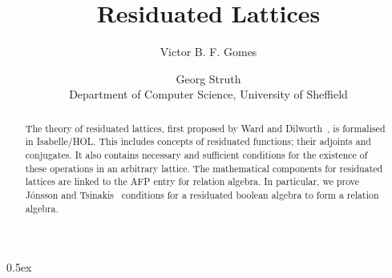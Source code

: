 \documentclass[11pt,a4paper]{article}
\begin{document}
\title{Residuated Lattices}
\author{Victor B. F. Gomes \and Georg Struth \\
  Department of Computer Science, University of Sheffield}
\maketitle

\begin{abstract}
  The theory of residuated lattices, first proposed by Ward and Dilworth~\cite{Ward39},
  is formalised in Isabelle/HOL.
  This includes concepts of residuated functions; their adjoints and conjugates.
  It also contains necessary and sufficient conditions for the existence of these operations
  in an arbitrary lattice.
  The mathematical components for residuated lattices are linked to the AFP entry for relation algebra.
  In particular, we prove J{\'o}nsson and Tsinakis~\cite{Jonsson93} conditions for a residuated
  boolean algebra to form a relation algebra.
\end{abstract}

\tableofcontents

\parindent 0pt\parskip 0.5ex





\end{document}
